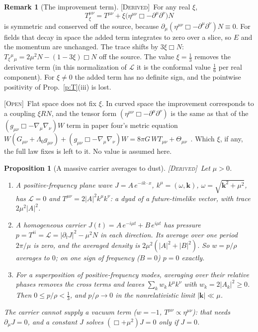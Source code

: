 \documentclass[10pt]{article}
\newtheorem{proposition}[theorem]{Proposition}
\theoremstyle{definition}
\newtheorem{remark}[theorem]{Remark}
\newcommand{\Derived}{\textup{\textsc{[Derived]}}\ }
\newcommand{\Open}{\textup{\textsc{[Open]}}\ }
\begin{document}
\begin{remark}[The improvement term]\label{r:improve}
\Derived For any real $\xi$,
\begin{equation}\label{e:improve}
T_\xi^{\mu\nu}=T^{\mu\nu}+\xi\big(\eta^{\mu\nu}\Box-\partial^\mu\partial^\nu\big)N
\end{equation}
is symmetric and conserved off the source, because $\partial_\mu(\eta^{\mu\nu}\Box-\partial^\mu\partial^\nu)N\equiv0$. For fields that decay in space the added term integrates to zero over a slice, so $E$ and the momentum are unchanged. The trace shifts by $3\xi\Box N$: $T_\xi{}^\mu{}_\mu=2\mu^2N-(1-3\xi)\Box N$ off the source. The value $\xi=\tfrac13$ removes the derivative term (in this normalization of $\mathcal L$ it is the conformal value $\tfrac16$ per real component). For $\xi\neq0$ the added term has no definite sign, and the pointwise positivity of Prop.~\ref{p:T}(iii) is lost.

\Open Flat space does not fix $\xi$. In curved space the improvement corresponds to a coupling $\xi RN$, and the tensor form $(\eta^{\mu\nu}\Box-\partial^\mu\partial^\nu)$ is the same as that of the $(g_{\mu\nu}\Box-\nabla_\mu\nabla_\nu)W$ term in paper four's metric equation $W(G_{\mu\nu}+\Lambda_0g_{\mu\nu})+(g_{\mu\nu}\Box-\nabla_\mu\nabla_\nu)W=8\pi G\,WT_{\mu\nu}+\Theta_{\mu\nu}$~\cite{varclos}. Which $\xi$, if any, the full law fixes is left to it. No value is assumed here.
\end{remark}

\begin{proposition}[A massive carrier averages to dust]\label{p:dust}
\Derived Let $\mu>0$.
\begin{enumerate}\itemsep1pt
\item[(a)] A positive-frequency plane wave $J=A\,e^{-ik\cdot x}$, $k^\mu=(\omega,\mathbf k)$, $\omega=\sqrt{\mathbf k^2+\mu^2}$, has $\mathcal L=0$ and $T^{\mu\nu}=2|A|^2k^\mu k^\nu$: a dyad of a future-timelike vector, with trace $2\mu^2|A|^2$.
\item[(b)] A homogeneous carrier $J(t)=A\,e^{-i\mu t}+B\,e^{i\mu t}$ has pressure $p=T^{ii}=\mathcal L=|\partial_tJ|^2-\mu^2N$ in each direction. Its average over one period $2\pi/\mu$ is zero, and the averaged density is $2\mu^2(|A|^2+|B|^2)$. So $w=p/\rho$ averages to $0$; on one sign of frequency ($B=0$) $p=0$ exactly.
\item[(c)] For a superposition of positive-frequency modes, averaging over their relative phases removes the cross terms and leaves $\sum_kw_k\,k^\mu k^\nu$ with $w_k=2|A_k|^2\ge0$. Then $0\le p/\rho<\tfrac13$, and $p/\rho\to0$ in the nonrelativistic limit $|\mathbf k|\ll\mu$.
\end{enumerate}
The carrier cannot supply a vacuum term ($w=-1$, $T^{\mu\nu}\propto\eta^{\mu\nu}$): that needs $\partial_\mu J=0$, and a constant $J$ solves $(\Box+\mu^2)J=0$ only if $J=0$.
\end{proposition}
\end{document}
